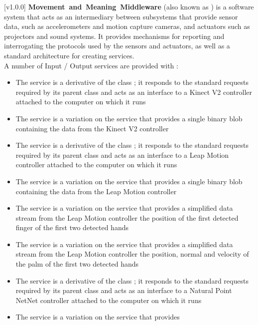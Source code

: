 [v1.0.0]
\textbf{Movement~and~Meaning~Middleware} (also known as \mplusm{}) is a software system
that acts as an intermediary between subsystems that provide sensor data, such as
accelerometers and motion capture cameras, and actuators such as projectors and sound
systems.
It provides mechanisms for reporting and interrogating the protocols used by the sensors
and actuators, as well as a standard architecture for creating services.\\

A number of Input / Output services are provided with \mplusm:
\begin{itemize}
\item The \textbf{\KVtwoI} service is a derivative of the \mplusm{} class
;
it responds to the standard requests required by its parent class and acts as an interface
to a Kinect V2 controller attached to the computer on which it runs
\item\exSp{}The \textbf{\KVtwoBI} service is a variation on the \KVtwoI{} service that
provides a single binary blob containing the data from the Kinect V2 controller
\item\exSp{}The \textbf{\LMI} service is a derivative of the \mplusm{} class
;
it responds to the standard requests required by its parent class and acts as an interface
to a Leap Motion controller attached to the computer on which it runs
\item\exSp{}The \textbf{\LBI} service is a variation on the \LMI{} service that provides a
single binary blob containing the data from the Leap Motion controller
\item\exSp{}The \textbf{\LTFI} service is a variation on the \LMI{} service that provides
a simplified data stream from the Leap Motion controller \longDash{} the position of the
first detected finger of the first two detected hands
\item\exSp{}The \textbf{\LTPI} service is a variation on the \LMI{} service that provides
a simplified data stream from the Leap Motion controller \longDash{} the position, normal
and velocity of the palm of the first two detected hands
\item\exSp{}The \textbf{\NNI} service is a derivative of the \mplusm{} class
;
it responds to the standard requests required by its parent class and acts as an interface
to a Natural Point NetNet controller attached to the computer on which it runs
\item\exSp{}The \textbf{\NNBI} service is a variation on the \NNI{} service that provides

\end{itemize}
